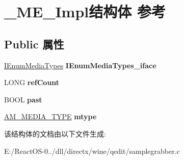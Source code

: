 \hypertarget{struct___m_e___impl}{}\section{\+\_\+\+M\+E\+\_\+\+Impl结构体 参考}
\label{struct___m_e___impl}
\subsection*{Public 属性}
\begin{DoxyCompactItemize}
\item 
\mbox{\label{struct___m_e___impl_af2a02558e9d99282757f260d898a0d84}} 
\hyperlink{interface_i_enum_media_types}{I\+Enum\+Media\+Types} {\bfseries I\+Enum\+Media\+Types\+\_\+iface}
\item 
\mbox{\label{struct___m_e___impl_a959f675eab411b79540b3bf0de16bb80}} 
L\+O\+NG {\bfseries ref\+Count}
\item 
\mbox{\label{struct___m_e___impl_a588ee631c3dc6bbb1ee05c98a157f08e}} 
B\+O\+OL {\bfseries past}
\item 
\mbox{\label{struct___m_e___impl_a6b87008991ff46b5a77b9453a026fcde}} 
\hyperlink{struct_a_m___m_e_d_i_a___t_y_p_e}{A\+M\+\_\+\+M\+E\+D\+I\+A\+\_\+\+T\+Y\+PE} {\bfseries mtype}
\end{DoxyCompactItemize}


该结构体的文档由以下文件生成\+:\begin{DoxyCompactItemize}
\item 
E\+:/\+React\+O\+S-\/0../dll/directx/wine/qedit/samplegrabber.\+c\end{DoxyCompactItemize}
